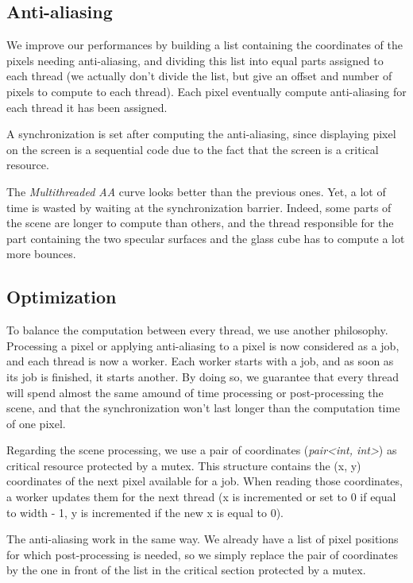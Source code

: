 \subsection{Anti-aliasing}
We improve our performances by building a list containing the coordinates of the pixels needing anti-aliasing, and dividing this list into equal parts assigned to each thread (we actually don't divide the list, but give an offset and number of pixels to compute to each thread). Each pixel eventually compute anti-aliasing for each thread it has been assigned.

A synchronization is set after computing the anti-aliasing, since displaying pixel on the screen is a sequential code due to the fact that the screen is a critical resource.

The \textit{Multithreaded AA} curve looks better than the previous ones. Yet, a lot of time is wasted by waiting at the synchronization barrier. Indeed, some parts of the scene are longer to compute than others, and the thread responsible for the part containing the two specular surfaces and the glass cube has to compute a lot more bounces.

\subsection{Optimization}
To balance the computation between every thread, we use another philosophy. Processing a pixel or applying anti-aliasing to a pixel is now considered as a job, and each thread is now a worker. Each worker starts with a job, and as soon as its job is finished, it starts another. By doing so, we guarantee that every thread will spend almost the same amound of time processing or post-processing the scene, and that the synchronization won't last longer than the computation time of one pixel.

Regarding the scene processing, we use a pair of coordinates (\textit{pair<int, int>}) as critical resource protected by a mutex. This structure contains the (x, y) coordinates of the next pixel available for a job. When reading those coordinates, a worker updates them for the next thread (x is incremented or set to 0 if equal to width - 1, y is incremented if the new x is equal to 0).

The anti-aliasing work in the same way. We already have a list of pixel positions for which post-processing is needed, so we simply replace the pair of coordinates by the one in front of the list in the critical section protected by a mutex.

